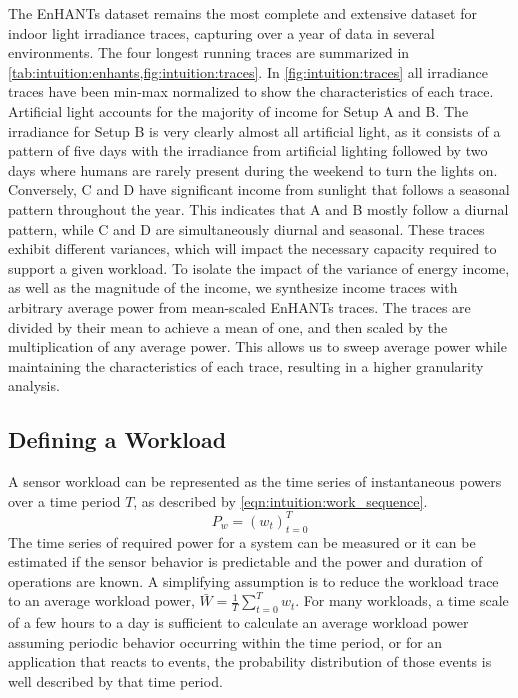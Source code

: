 The EnHANTs dataset remains the most complete and extensive dataset for indoor light
irradiance traces, capturing over a year of data in several environments.
The four longest running traces are summarized in \cref{tab:intuition:enhants,fig:intuition:traces}.
In \cref{fig:intuition:traces} all irradiance traces have been min-max normalized to show the characteristics of each trace.
Artificial light accounts for the majority of income for Setup A and B.
The irradiance for Setup B is very clearly almost all artificial light, as it consists of a pattern of five days with the irradiance from artificial lighting followed by two days where humans are rarely present during the weekend to turn the lights on. 
Conversely, C and D have significant income from sunlight that follows a seasonal pattern throughout the year.
This indicates that A and B mostly follow a diurnal pattern, while C and D are simultaneously diurnal and seasonal.
These traces exhibit different variances, which will impact the necessary capacity required to support a given workload.
To isolate the impact of the variance of energy income, as well as the magnitude of the income, we synthesize income traces with arbitrary average power from mean-scaled EnHANTs traces. The traces are divided by their mean to achieve a mean of one, and then scaled by the multiplication of any average power.
This allows us to sweep average power while maintaining the characteristics of each trace, resulting in a higher granularity analysis.

\subsection{Defining a Workload}
A sensor workload can be represented as the time series of instantaneous powers over a time period $T$, as described by \cref{eqn:intuition:work_sequence}. 
\begin{equation} \label{eqn:intuition:work_sequence}
    P_w = (w_{t})^{T}_{t=0} 
\end{equation}
The time series of required power for a system can be measured or it can be estimated if the sensor behavior is predictable and the power and duration of operations are known.
A simplifying assumption is to reduce the workload trace to an average workload power, $\bar{W} = \frac{1}{T}\sum_{t=0}^T w_t$.
For many workloads, a time scale of a few hours to a day is sufficient to calculate an average workload power assuming periodic behavior occurring within the time period, or for an application that reacts to events, the probability distribution of those events is well described by that time period.



